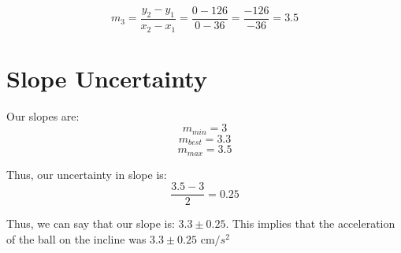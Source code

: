 \documentclass[12pt, letterpaper]{article}
\begin{document}
\[
m_3= \frac{y_2 - y_1}{x_2 - x_1} = \frac{0 - 126}{0 - 36} = \frac{-126}{-36} = 3.5
\]

\section{Slope Uncertainty}
Our slopes are:
\[
m_{min} = 3
\]
\[
m_{best} = 3.3
\]
\[
m_{max} = 3.5
\]

Thus, our uncertainty in slope is:
\[
\frac{3.5-3}{2} = 0.25
\]

Thus, we can say that our slope is: $3.3 \pm 0.25$. This implies that the acceleration of the ball on the incline was $3.3 \pm 0.25 \text{ cm/}s^2 $ 
\end{document}
